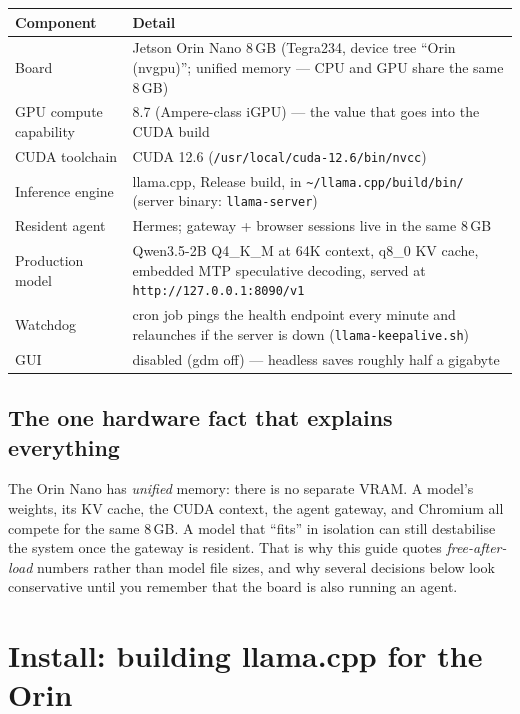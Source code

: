 \documentclass[11pt,a4paper]{article}
\begin{document}
\begin{center}
\small
\begin{tabularx}{\textwidth}{L{3.4cm} X}
\toprule
\textbf{Component} & \textbf{Detail} \\
\midrule
Board & Jetson Orin Nano 8\,GB (Tegra234, device tree ``Orin (nvgpu)''; unified memory --- CPU and GPU share the same 8\,GB) \\
GPU compute capability & 8.7 (Ampere-class iGPU) --- the value that goes into the CUDA build \\
CUDA toolchain & CUDA 12.6 (\texttt{/usr/local/cuda-12.6/bin/nvcc}) \\
Inference engine & llama.cpp, Release build, in \texttt{\textasciitilde/llama.cpp/build/bin/} (server binary: \texttt{llama-server}) \\
Resident agent & Hermes; gateway + browser sessions live in the same 8\,GB \\
Production model & Qwen3.5-2B Q4\_K\_M at 64K context, q8\_0 KV cache, embedded MTP speculative decoding, served at \texttt{http://127.0.0.1:8090/v1} \\
Watchdog & cron job pings the health endpoint every minute and relaunches if the server is down (\texttt{llama-keepalive.sh}) \\
GUI & disabled (gdm off) --- headless saves roughly half a gigabyte \\
\bottomrule
\end{tabularx}
\end{center}

\subsection{The one hardware fact that explains everything}

The Orin Nano has \emph{unified} memory: there is no separate VRAM. A model's
weights, its KV cache, the CUDA context, the agent gateway, and Chromium all
compete for the same 8\,GB. A model that ``fits'' in isolation can still
destabilise the system once the gateway is resident. That is why this guide
quotes \emph{free-after-load} numbers rather than model file sizes, and why
several decisions below look conservative until you remember that the board
is also running an agent.

\section{Install: building llama.cpp for the Orin}
\end{document}
